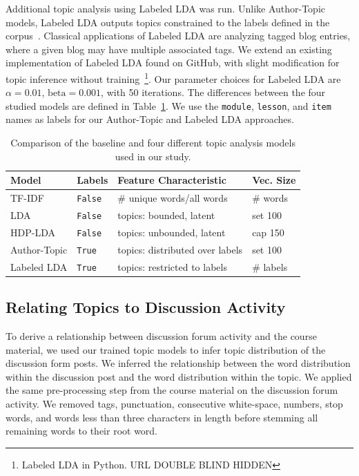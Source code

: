 \documentclass[sigconf, nonacm=true]{acmart}
\begin{document}
Additional topic analysis using Labeled LDA was run.
Unlike Author-Topic models, Labeled LDA outputs topics constrained to the labels defined in the corpus~\cite{ramage2009labeled}.
Classical applications of Labeled LDA are analyzing tagged blog entries, where a given blog may have multiple associated tags.
We extend an existing implementation of Labeled LDA found on GitHub, with slight modification for topic inference without training~\footnote{Labeled LDA in Python.
    URL DOUBLE BLIND HIDDEN}.
Our parameter choices for Labeled LDA are $\alpha=0.01$, $\text{beta}=0.001$, with 50 iterations.
The differences between the four studied models are defined in Table~\ref{tab:topic_models}. We use the \texttt{module}, \texttt{lesson}, and \texttt{item} names as labels for our Author-Topic and Labeled LDA approaches.

\begin{table}
    \centering
    \begin{tabularx}{\columnwidth}{@{}llll@{}}
    \toprule
    Model & Labels & Feature Characteristic & Vec. Size \\
    \midrule
    TF-IDF & \texttt{False} & \# unique words/all words & \# words \\
    LDA & \texttt{False} & topics: bounded, latent & set 100 \\
    HDP-LDA & \texttt{False} & topics: unbounded, latent  & cap 150 \\
    Author-Topic & \texttt{True} & topics: distributed over labels & set 100 \\
    Labeled LDA & \texttt{True} & topics: restricted to labels & \# labels \\
    \bottomrule
    \end{tabularx}
    \caption{Comparison of the baseline and four different topic analysis models used in our study.}
    \label{tab:topic_models}
\end{table}

\subsection{Relating Topics to Discussion Activity}
To derive a relationship between discussion forum activity and the course material, we used our trained topic models to infer topic distribution of the discussion form posts.
We inferred the relationship between the word distribution within the discussion post and the word distribution within the topic.
We applied the same pre-processing step from the course material on the discussion forum activity. We removed tags, punctuation, consecutive white-space, numbers, stop words, and words less than three characters in length before stemming all remaining words to their root word.
\end{document}
